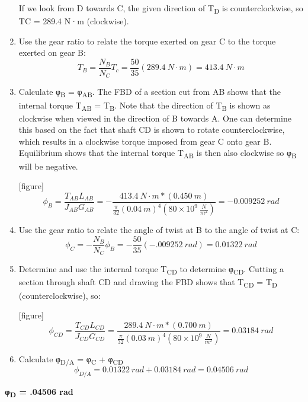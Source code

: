 \documentclass[
  letterpaper,
  DIV=11,
  numbers=noendperiod]{scrreprt}
\theoremstyle{definition}
\theoremstyle{remark}
\begin{document}
\begin{tcolorbox}
\begin{tcolorbox}
\begin{enumerate}
  \hfill\break
  If we look from D towards C, the given direction of T\textsubscript{D}
  is counterclockwise, so TC = 289.4 N·m (clockwise).
\item
  Use the gear ratio to relate the torque exerted on gear C to the
  torque exerted on gear B:\\
  \[
  T_B=\frac{N_B}{N_C} T_c=\frac{50}{35}(289.4{~N}\cdot{m})=413.4{~N}\cdot{m}
  \]
\item
  Calculate φ\textsubscript{B} = φ\textsubscript{AB}. The FBD of a
  section cut from AB shows that the internal torque T\textsubscript{AB}
  = T\textsubscript{B}. Note that the direction of T\textsubscript{B} is
  shown as clockwise when viewed in the direction of B towards A. One
  can determine this based on the fact that shaft CD is shown to rotate
  counterclockwise, which results in a clockwise torque imposed from
  gear C onto gear B. Equilibrium shows that the internal torque
  T\textsubscript{AB} is then also clockwise so φ\textsubscript{B} will
  be negative.

  \hfill\break
  {[}figure{]}\\
  \[
  \phi_B=\frac{T_{AB}L_{AB}}{J_{AB}G_{AB}}=-\frac{413.4{~N}\cdot{m}*(0.450{~m})}{\frac{\pi}{32}(0.04{~m})^4\left(80 \times 10^9~\frac{{N}}{{m}^2}\right)}=-0.009252{~rad}
  \]
\item
  Use the gear ratio to relate the angle of twist at B to the angle of
  twist at C:\\
  \[
  \phi_C=-\frac{N_B}{N_C} \phi_B=-\frac{50}{35}(-.009252{~rad})=0.01322{~rad}
  \]
\item
  Determine and use the internal torque T\textsubscript{CD} to determine
  φ\textsubscript{CD}. Cutting a section through shaft CD and drawing
  the FBD shows that T\textsubscript{CD} = T\textsubscript{D}
  (counterclockwise), so:

  \hfill\break
  {[}figure{]}\\
  \[
  \phi_{C D}=\frac{T_{CD}L_{CD}}{J_{CD}G_{CD}}=\frac{289.4{~N}\cdot{m}*(0.700 {~m})}{\frac{\pi}{32}(0.03{~m})^4\left(80 \times 10^9~\frac{{N}}{{m}^2}\right)}=0.03184{~rad}
  \]
\item
  Calculate φ\textsubscript{D/A} = φ\textsubscript{C} +
  φ\textsubscript{CD}\\
  \[
  \phi_{D/A}=0.01322{~rad}+0.03184{~rad}=0.04506{~rad}
  \]
\end{enumerate}

\textbf{φ\textsubscript{D} = .04506 rad}

\end{tcolorbox}

\end{tcolorbox}
\end{document}
